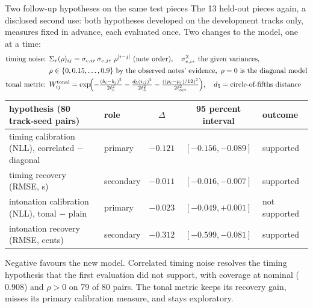 \documentclass[aspectratio=169,11pt]{beamer}
\begin{document}
\begin{frame}{Two follow-up hypotheses on the same test pieces}
  The 13 held-out pieces again, a disclosed second use: both hypotheses
  developed on the development tracks only, measures fixed in advance,
  each evaluated once. Two changes to the model, one at a time:
  \vspace{-1mm}
  {\footnotesize
  \begin{align*}
    \text{timing noise: }& \Sigma_{\tau}(\rho)_{ij} = \sigma_{e,i\tau}\,\sigma_{e,j\tau}\;\rho^{|i-j|}
      \ \text{(note order)},\quad \sigma_{e,i\tau}^2 \text{ the given variances},\\
      & \rho \in \{0, 0.15, \dots, 0.9\} \text{ by the observed notes' evidence},
      \ \rho = 0 \text{ is the diagonal model}\\
    \text{tonal metric: }& W^{\mathrm{tonal}}_{ij} = \exp\!\Bigl( -\tfrac{(b_i-b_j)^2}{2\ell_b^2}
      - \tfrac{d_5(i,j)^2}{2\ell_5^2} - \tfrac{((p_i-p_j)/12)^2}{2\ell_{\mathrm{oct}}^2}\Bigr),
      \quad d_5 = \text{circle-of-fifths distance}
  \end{align*}}
  \vspace{-4mm}
  \begin{center}
  \footnotesize
  \setlength{\tabcolsep}{2.5pt}
  \begin{tabular}{@{}llccl@{}}
    \toprule
    hypothesis (80 track-seed pairs) & role & $\Delta$ & 95 percent interval & outcome \\
    \midrule
    timing calibration (NLL), correlated $-$ diagonal & primary & $-0.121$ & $[-0.156, -0.089]$ & supported \\
    timing recovery (RMSE, s) & secondary & $-0.011$ & $[-0.016, -0.007]$ & supported \\
    intonation calibration (NLL), tonal $-$ plain & primary & $-0.023$ & $[-0.049, +0.001]$ & not supported \\
    intonation recovery (RMSE, cents) & secondary & $-0.312$ & $[-0.599, -0.081]$ & supported \\
    \bottomrule
  \end{tabular}
  \end{center}
  \vspace{-1mm}
  {\small Negative favours the new model. Correlated timing noise
  resolves the timing hypothesis that the first evaluation did not
  support, with coverage at nominal ($0.908$) and $\rho > 0$ on 79 of 80
  pairs. The tonal metric keeps its recovery gain, misses its primary
  calibration measure, and stays exploratory.\par}
\end{frame}
\end{document}
